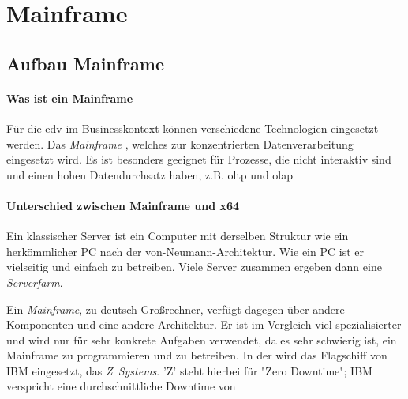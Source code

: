 \chapter{Mainframe}

\section{Aufbau Mainframe}

\subsubsection{Was ist ein Mainframe}
Für die \ac{edv} im Businesskontext können verschiedene Technologien eingesetzt werden. Das \emph{Mainframe} \cite[ist ein zentrales Datenlager]{redbook.1}, welches zur konzentrierten Datenverarbeitung eingesetzt wird. Es ist besonders geeignet für Prozesse, die nicht interaktiv sind und einen hohen Datendurchsatz haben, z.B. \ac{oltp} und \ac{olap}


\subsubsection[Z Systems vs. x64]{Unterschied zwischen Mainframe und x64}
Ein klassischer Server ist ein Computer mit derselben Struktur wie ein herkömmlicher PC nach der \mbox{von-Neumann-Architektur}. Wie ein PC ist er vielseitig und einfach zu betreiben. Viele Server zusammen ergeben dann eine \emph{Serverfarm}.

Ein \emph{Mainframe}, zu deutsch Großrechner, verfügt dagegen über andere Komponenten und eine andere Architektur. Er ist im Vergleich viel spezialisierter und wird nur für sehr konkrete Aufgaben verwendet, da es sehr schwierig ist, ein Mainframe zu programmieren und zu betreiben. In der \FirmenName wird das Flagschiff von IBM eingesetzt, das \emph{\mbox{Z Systems}}. 'Z' steht hierbei für "Zero Downtime"; IBM verspricht eine durchschnittliche Downtime von 


